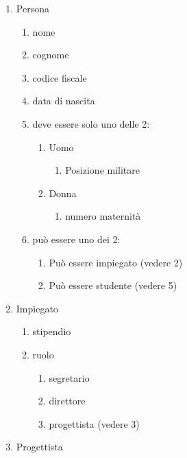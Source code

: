 \documentclass{article}
\begin{document}
\renewcommand{\labelenumii}{\arabic{enumi}.\arabic{enumii}}
\renewcommand{\labelenumiii}{\arabic{enumi}.\arabic{enumii}.\arabic{enumiii}}
\renewcommand{\labelenumiv}{\arabic{enumi}.\arabic{enumii}.\arabic{enumiii}.\arabic{enumiv}}

\begin{enumerate}
    \item Persona
    \begin{enumerate}
        \item nome
        \item cognome
        \item codice fiscale
        \item data di nascita
        \item deve essere solo uno delle 2:
        \begin{enumerate}
            \item Uomo
            \begin{enumerate}
                \item Posizione militare
            \end{enumerate}
            \item Donna
            \begin{enumerate}
                \item numero maternità
            \end{enumerate}
        \end{enumerate}
        \item può essere uno dei 2:
        \begin{enumerate}
            \item Può essere impiegato (vedere 2)
            \item Può essere studente (vedere 5)
        \end{enumerate}
    \end{enumerate}
    \item Impiegato
    \begin{enumerate}
        \item stipendio
        \item ruolo
        \begin{enumerate}
            \item segretario
            \item direttore
            \item progettista (vedere 3)
        \end{enumerate}
    \end{enumerate}
    \item Progettista

\end{enumerate}
\end{document}
